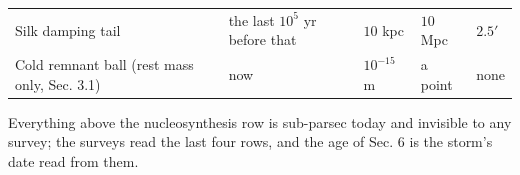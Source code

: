 \documentclass[
  11pt,
]{article}
\begin{document}
\begin{longtable}[]{@{}lllll@{}}
\begin{minipage}[t]{0.17\columnwidth}\raggedright
Silk damping tail\strut
\end{minipage} & \begin{minipage}[t]{0.17\columnwidth}\raggedright
the last \(10^5\) yr before that\strut
\end{minipage} & \begin{minipage}[t]{0.17\columnwidth}\raggedright
\(10\) kpc\strut
\end{minipage} & \begin{minipage}[t]{0.17\columnwidth}\raggedright
\(10\) Mpc\strut
\end{minipage} & \begin{minipage}[t]{0.17\columnwidth}\raggedright
\(2.5'\)\strut
\end{minipage}\tabularnewline
\begin{minipage}[t]{0.17\columnwidth}\raggedright
Cold remnant ball (rest mass only, Sec. 3.1)\strut
\end{minipage} & \begin{minipage}[t]{0.17\columnwidth}\raggedright
now\strut
\end{minipage} & \begin{minipage}[t]{0.17\columnwidth}\raggedright
\(10^{-15}\) m\strut
\end{minipage} & \begin{minipage}[t]{0.17\columnwidth}\raggedright
a point\strut
\end{minipage} & \begin{minipage}[t]{0.17\columnwidth}\raggedright
none\strut
\end{minipage}\tabularnewline
\bottomrule
\end{longtable}

Everything above the nucleosynthesis row is sub-parsec today and
invisible to any survey; the surveys read the last four rows, and the
age of Sec. 6 is the storm's date read from them.
\end{document}
